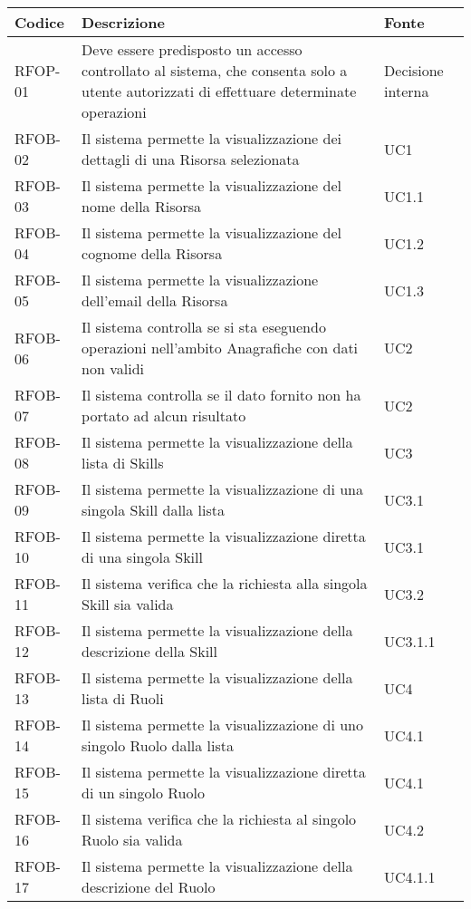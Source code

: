 \begin{center}
\begin{longtable}{p{2.0cm}|p{8cm}|p{2.7cm}}
\textbf{Codice}  & \textbf{Descrizione} & \textbf{Fonte}\\
\hline
\hypertarget{rf01}{RFOP-01}  &	 Deve essere predisposto un accesso controllato al sistema, che consenta solo a utente autorizzati di effettuare determinate operazioni & Decisione interna \\ 
RFOB-02  & Il sistema permette la visualizzazione dei dettagli di una Risorsa selezionata & UC1 \\ 
RFOB-03  & Il sistema permette la visualizzazione del nome della Risorsa & UC1.1 \\ 
RFOB-04  & Il sistema permette la visualizzazione del cognome della Risorsa & UC1.2 \\ 
RFOB-05  & Il sistema permette la visualizzazione dell'email della Risorsa & UC1.3 \\ 
RFOB-06  & Il sistema controlla se si sta eseguendo operazioni nell'ambito Anagrafiche con dati non validi & UC2 \\ 
RFOB-07  & Il sistema controlla se il dato fornito non ha portato ad alcun risultato & UC2 \\ 
RFOB-08  & Il sistema permette la visualizzazione della lista di Skills & UC3 \\ 
RFOB-09  & Il sistema permette la visualizzazione di una singola Skill dalla lista & UC3.1 \\ 
RFOB-10  & Il sistema permette la visualizzazione diretta di una singola Skill & UC3.1 \\ 
RFOB-11  & Il sistema verifica che la richiesta alla singola Skill sia valida & UC3.2 \\ 
RFOB-12  & Il sistema permette la visualizzazione della descrizione della Skill & UC3.1.1 \\ 
RFOB-13  & Il sistema permette la visualizzazione della lista di Ruoli & UC4 \\ 
RFOB-14  & Il sistema permette la visualizzazione di uno singolo Ruolo dalla lista & UC4.1 \\ 
RFOB-15  & Il sistema permette la visualizzazione diretta di un singolo Ruolo & UC4.1 \\ 
RFOB-16  & Il sistema verifica che la richiesta al singolo Ruolo sia valida & UC4.2 \\ 
RFOB-17  & Il sistema permette la visualizzazione della descrizione del Ruolo & UC4.1.1 \\ 

\end{longtable}
\end{center}
